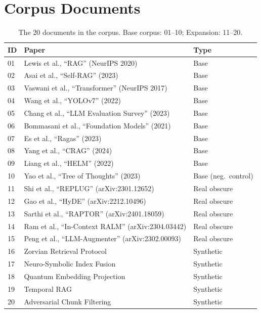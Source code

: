 \documentclass{article}
\begin{document}
\section{Corpus Documents}
\label{sec:corpus}

\begin{table}[h]
    \centering
    \caption{The 20 documents in the corpus. Base corpus: 01--10; Expansion: 11--20.}
    \begin{tabular}{lll}
        \toprule
        ID & Paper & Type \\
        \midrule
        01 & Lewis et al., ``RAG'' (NeurIPS 2020) & Base \\
        02 & Asai et al., ``Self-RAG'' (2023) & Base \\
        03 & Vaswani et al., ``Transformer'' (NeurIPS 2017) & Base \\
        04 & Wang et al., ``YOLOv7'' (2022) & Base \\
        05 & Chang et al., ``LLM Evaluation Survey'' (2023) & Base \\
        06 & Bommasani et al., ``Foundation Models'' (2021) & Base \\
        07 & Es et al., ``Ragas'' (2023) & Base \\
        08 & Yang et al., ``CRAG'' (2024) & Base \\
        09 & Liang et al., ``HELM'' (2022) & Base \\
        10 & Yao et al., ``Tree of Thoughts'' (2023) & Base (neg.\ control) \\
        \midrule
        11 & Shi et al., ``REPLUG'' (arXiv:2301.12652) & Real obscure \\
        12 & Gao et al., ``HyDE'' (arXiv:2212.10496) & Real obscure \\
        13 & Sarthi et al., ``RAPTOR'' (arXiv:2401.18059) & Real obscure \\
        14 & Ram et al., ``In-Context RALM'' (arXiv:2304.03442) & Real obscure \\
        15 & Peng et al., ``LLM-Augmenter'' (arXiv:2302.00093) & Real obscure \\
        16 & Zorvian Retrieval Protocol & Synthetic \\
        17 & Neuro-Symbolic Index Fusion & Synthetic \\
        18 & Quantum Embedding Projection & Synthetic \\
        19 & Temporal RAG & Synthetic \\
        20 & Adversarial Chunk Filtering & Synthetic \\
        \bottomrule
    \end{tabular}
\end{table}
\end{document}

